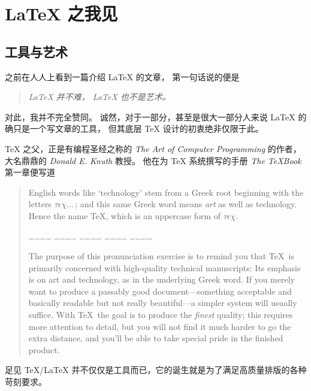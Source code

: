 \makectitle

\chapter{\LaTeX{} 之我见}

\section{工具与艺术}

之前在人人上看到一篇介绍 \LaTeX{} 的文章，
第一句话说的便是
\begin{quotation}
  \it \LaTeX{} 并不难， \LaTeX{} 也不是艺术。
\end{quotation}
对此，我并不完全赞同。
诚然，对于一部分，甚至是很大一部分人来说
\LaTeX{} 的确只是一个写文章的工具，
但其底层 \TeX{} 设计的初衷绝非仅限于此。

\TeX{} 之父，正是有编程圣经之称的 {\it The Art of Computer Programming\/} 的作者，
大名鼎鼎的 \textit{Donald E. Knuth\/} 教授。
他在为 \TeX{} 系统撰写的手册 \textit{The TeXBook\/} 第一章便写道

\begin{quotation}
  \small
  English words like `technology' stem from a Greek root beginning with
  the letters $\tau\epsilon\chi\ldots\,$; and this same Greek word means {\sl
  art\/} as well as technology. Hence the name \TeX, which is an
  uppercase form of $\tau\epsilon\chi$.
  
  \begin{center}
      \ldots\ldots\ldots\ldots\qquad
      \ldots\ldots\ldots\ldots\qquad
      \ldots\ldots\ldots\ldots\qquad
      \ldots\ldots\ldots\ldots\qquad
      \ldots\ldots\ldots\ldots
  \end{center}
  
  The purpose of this pronunciation exercise is to remind you that \TeX\ is
  primarily concerned with high-quality technical manuscripts: Its emphasis is
  on art and technology, as in the underlying Greek word. If you merely want
  to produce a passably good document---something acceptable and basically
  readable but not really beautiful---a simpler system will usually suffice.
  With \TeX\ the goal is to produce the {\sl finest\/} quality; this requires
  more attention to detail, but you will not find it much harder to go the
  extra distance, and you'll be able to take special pride in the finished
  product.
\end{quotation}
足见 \TeX{}/\LaTeX{} 并不仅仅是工具而已，它的诞生就是为了满足高质量排版的各种苛刻要求。

